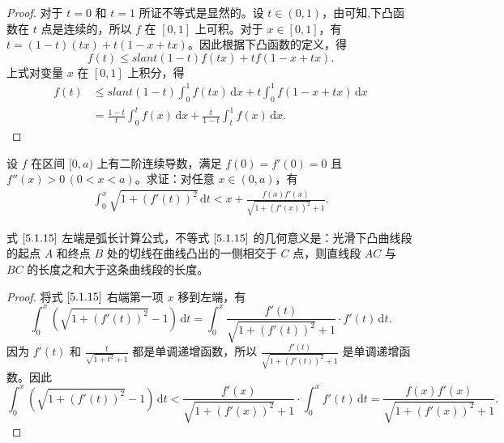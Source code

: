 \documentclass[../../main.tex]{subfiles}
\begin{document}
\begin{proof}
对于 \( t = 0 \) 和 \( t = 1 \) 所证不等式是显然的。设 \( t \in (0,1) \)，由可知,下凸函数在 \( t \) 点是连续的，所以 \( f \) 在 \([0,1]\) 上可积。对于 \( x \in [0,1] \)，有 \( t = (1 - t)(tx) + t(1 - x + tx) \)。因此根据下凸函数的定义，得
\[
f(t) \leqslant slant (1 - t)f(tx) + tf(1 - x + tx).
\]
上式对变量 \( x \) 在 \([0,1]\) 上积分，得
\begin{align*}
f(t) &\leqslant slant (1 - t) \int_{0}^{1} f(tx) \, \mathrm{d}x + t \int_{0}^{1} f(1 - x + tx) \, \mathrm{d}x
\\
&= \frac{1 - t}{t} \int_{0}^{t} f(x) \, \mathrm{d}x + \frac{t}{1 - t} \int_{t}^{1} f(x) \, \mathrm{d}x.
\end{align*}
\end{proof}

\begin{proposition}
设 \( f \) 在区间 \([0,a)\) 上有二阶连续导数，满足 \( f(0) = f'(0) = 0 \) 且 \( f''(x) > 0 \, (0 < x < a) \)。求证：对任意 \( x \in (0,a) \)，有
\begin{align}
\int_{0}^{x} \sqrt{1 + (f'(t))^2} \, \mathrm{d}t < x + \frac{f(x)f'(x)}{\sqrt{1 + (f'(x))^2} + 1}. \label{5.1.15}
\end{align}
\end{proposition}
\begin{remark}
式 \(\eqref{5.1.15}\) 左端是弧长计算公式，不等式 \(\eqref{5.1.15}\) 的几何意义是：光滑下凸曲线段的起点 \( A \) 和终点 \( B \) 处的切线在曲线凸出的一侧相交于 \( C \) 点，则直线段 \( AC \) 与 \( BC \) 的长度之和大于这条曲线段的长度。
\end{remark}
\begin{proof}
将式 \(\eqref{5.1.15}\) 右端第一项 \( x \) 移到左端，有
\[
\int_{0}^{x} \left( \sqrt{1 + (f'(t))^2} - 1 \right) \, \mathrm{d}t = \int_{0}^{x} \frac{f'(t)}{\sqrt{1 + (f'(t))^2} + 1} \cdot f'(t) \, \mathrm{d}t.
\]
因为 \( f'(t) \) 和 \( \frac{t}{\sqrt{1 + t^2} + 1} \) 都是单调递增函数，所以 \( \frac{f'(t)}{\sqrt{1 + (f'(t))^2} + 1} \) 是单调递增函数。因此
\[
\int_{0}^{x} \left( \sqrt{1 + (f'(t))^2} - 1 \right) \, \mathrm{d}t < \frac{f'(x)}{\sqrt{1 + (f'(x))^2} + 1} \cdot \int_{0}^{x} f'(t) \, \mathrm{d}t = \frac{f(x)f'(x)}{\sqrt{1 + (f'(x))^2} + 1}.
\]
\end{proof}
\end{document}
